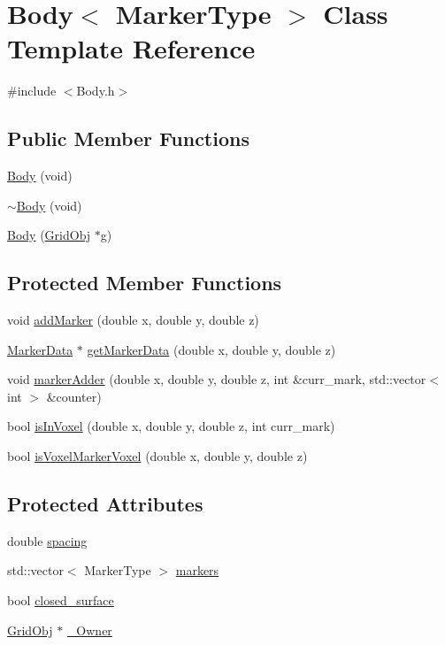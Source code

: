 \hypertarget{class_body}{}\section{Body$<$ Marker\+Type $>$ Class Template Reference}
\label{class_body}


{\ttfamily \#include $<$Body.\+h$>$}

\subsection*{Public Member Functions}
\begin{DoxyCompactItemize}
\item 
\hyperlink{class_body_a684a431c9215429149f36949ab007353}{Body} (void)
\item 
\hyperlink{class_body_a62fb64b91f20eeef2d454994bdbc8b37}{$\sim$\+Body} (void)
\item 
\hyperlink{class_body_a939c580274ddf89d1a7e8c6b12ea70ca}{Body} (\hyperlink{class_grid_obj}{Grid\+Obj} $\ast$g)
\end{DoxyCompactItemize}
\subsection*{Protected Member Functions}
\begin{DoxyCompactItemize}
\item 
void \hyperlink{class_body_aa965f7b498528230aa2f56a9abf6bf06}{add\+Marker} (double x, double y, double z)
\item 
\hyperlink{class_marker_data}{Marker\+Data} $\ast$ \hyperlink{class_body_aebc3c7911b4ad10b1f9853d3f5fc7514}{get\+Marker\+Data} (double x, double y, double z)
\item 
void \hyperlink{class_body_a3a1ba74da8020cc3ee7f4fffde0b4477}{marker\+Adder} (double x, double y, double z, int \&curr\+\_\+mark, std\+::vector$<$ int $>$ \&counter)
\item 
bool \hyperlink{class_body_aa7733bbcd85af5fa4e8822889fba7b33}{is\+In\+Voxel} (double x, double y, double z, int curr\+\_\+mark)
\item 
bool \hyperlink{class_body_a3ed926c01461f32d64b4a5405e920e36}{is\+Voxel\+Marker\+Voxel} (double x, double y, double z)
\end{DoxyCompactItemize}
\subsection*{Protected Attributes}
\begin{DoxyCompactItemize}
\item 
double \hyperlink{class_body_a1d4ac2e6fdbc946d5eab0973fd78770b}{spacing}
\item 
std\+::vector$<$ Marker\+Type $>$ \hyperlink{class_body_a4e0ac821f2331ec67793a44e36c855e3}{markers}
\item 
bool \hyperlink{class_body_a2701bdb00789d26ed72d6138d2e21bcb}{closed\+\_\+surface}
\item 
\hyperlink{class_grid_obj}{Grid\+Obj} $\ast$ \hyperlink{class_body_a5197f31e50222c32adefb795a93d7156}{\+\_\+\+Owner}
\end{DoxyCompactItemize}


